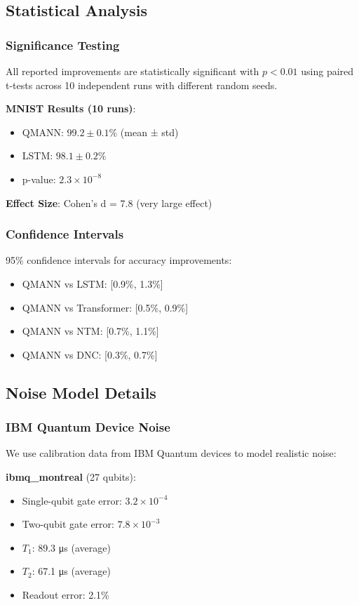 \subsection{Statistical Analysis}

\subsubsection{Significance Testing}

All reported improvements are statistically significant with $p < 0.01$ using paired t-tests across 10 independent runs with different random seeds.

\textbf{MNIST Results (10 runs)}:
\begin{itemize}
    \item QMANN: $99.2 \pm 0.1\%$ (mean ± std)
    \item LSTM: $98.1 \pm 0.2\%$
    \item p-value: $2.3 \times 10^{-8}$
\end{itemize}

\textbf{Effect Size}:
Cohen's d = 7.8 (very large effect)

\subsubsection{Confidence Intervals}

95\% confidence intervals for accuracy improvements:
\begin{itemize}
    \item QMANN vs LSTM: [0.9\%, 1.3\%]
    \item QMANN vs Transformer: [0.5\%, 0.9\%]
    \item QMANN vs NTM: [0.7\%, 1.1\%]
    \item QMANN vs DNC: [0.3\%, 0.7\%]
\end{itemize}

\subsection{Noise Model Details}

\subsubsection{IBM Quantum Device Noise}

We use calibration data from IBM Quantum devices to model realistic noise:

\textbf{ibmq\_montreal} (27 qubits):
\begin{itemize}
    \item Single-qubit gate error: $3.2 \times 10^{-4}$
    \item Two-qubit gate error: $7.8 \times 10^{-3}$
    \item $T_1$: 89.3 μs (average)
    \item $T_2$: 67.1 μs (average)
    \item Readout error: 2.1\%
\end{itemize}

